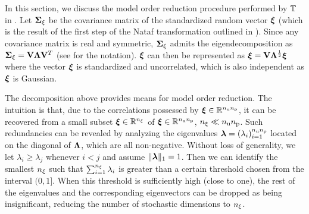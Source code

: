 In this section, we discuss the model order reduction procedure performed by $\transformation$ in .
Let $\mCov_\z$ be the covariance matrix of the standardized random vector $\vz$ (which is the result of the first step of the Nataf transformation outlined in ).
Since any covariance matrix is real and symmetric, $\mCov_\z$ admits the eigendecomposition as $\mCov_\z = \mEDV \mEDL \mEDV^T$ (see  for the notation).
$\vz$ can then be represented as $\vz = \mEDV \mEDL^\frac{1}{2} \vz$ where the vector $\vz$ is standardized and uncorrelated, which is also independent as $\vz$ is Gaussian.

The decomposition above provides means for model order reduction.
The intuition is that, due to the correlations possessed by $\vz \in \real^{\nparams \nprocs}$, it can be recovered from a small subset $\vz \in \real^\nvars$ of $\vz\in \real^{\nparams \nprocs}$, $\nvars \ll \nparams \nprocs$.
Such redundancies can be revealed by analyzing the eigenvalues $\dimensionContribution = (\lambda_i)_{i = 1}^{\nparams \nprocs}$ located on the diagonal of $\mEDL$, which are all non-negative.
Without loss of generality, we let $\lambda_i \geq \lambda_j$ whenever $i < j$ and assume $\norm[1]{\dimensionContribution} = 1$.
Then we can identify the smallest $\nvars$ such that $\sum_{i = 1}^\nvars \lambda_i$ is greater than a certain threshold chosen from the interval $(0, 1]$.
When this threshold is sufficiently high (close to one), the rest of the eigenvalues and the corresponding eigenvectors can be dropped as being insignificant, reducing the number of stochastic dimensions to $\nvars$.
